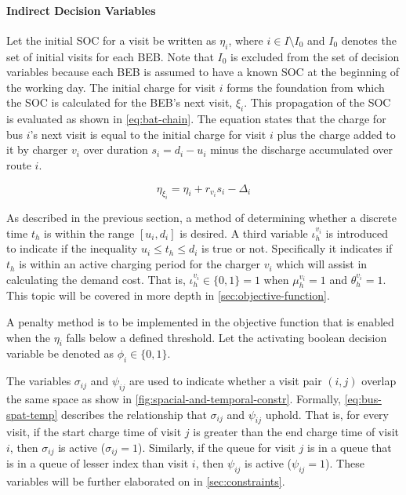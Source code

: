 \documentclass[11pt,a4paper,final]{article}
\newcommand{\Iset}{I}                       %
\begin{document}
\paragraph{Indirect Decision Variables}
\label{sec:indirect-decision-variables}
Let the initial SOC for a visit be written as \(\eta_i\), where \(i \in \Iset \setminus \Iset_0\) and \(\Iset_0\) denotes the set of
initial visits for each BEB. Note that \(\Iset_0\) is excluded from the set of decision variables because each BEB is
assumed to have a known SOC at the beginning of the working day. The initial charge for visit \(i\) forms the foundation
from which the SOC is calculated for the BEB's next visit, \(\xi_i\). This propagation of the SOC is evaluated as shown in
\ref{eq:bat-chain}. The equation states that the charge for bus \(i\)'s next visit is equal to the initial charge for visit \(i\)
plus the charge added to it by charger \(v_i\) over duration \(s_i = d_i - u_i\) minus the discharge accumulated over route
\(i\).

\begin{equation}
\label{eq:bat-chain}
  \eta_{\xi_i} = \eta_i + r_{v_i}s_i - \Delta_i
\end{equation}

As described in the previous section, a method of determining whether a discrete time \(t_h\) is within the range \([u_i,
d_i]\) is desired. A third variable \(\iota_h^{v_i}\) is introduced to indicate if the inequality \(u_i \le t_h \le d_i\) is true or
not. Specifically it indicates if \(t_h\) is within an active charging period for the charger \(v_i\) which will assist in
calculating the demand cost. That is, \(\iota_h^{v_i} \in \{0,1\} = 1\) when \(\mu_h^{v_i} = 1\) and \(\theta_h^{v_i} = 1\). This topic
will be covered in more depth in \ref{sec:objective-function}.

A penalty method is to be implemented in the objective function that is enabled when the \(\eta_i\) falls below a defined
threshold. Let the activating boolean decision variable be denoted as \(\phi_i \in \{0,1\}\).

The variables \(\sigma_{ij}\) and \(\psi_{ij}\) are used to indicate whether a visit pair \((i, j)\) overlap the same space as show in
\ref{fig:spacial-and-temporal-constr}. Formally, \ref{eq:bus-spat-temp} describes the relationship that \(\sigma_{ij}\) and \(\psi_{ij}\)
uphold. That is, for every visit, if the start charge time of visit \(j\) is greater than the end charge time of visit
\(i\), then \(\sigma_{ij}\) is active (\(\sigma_{ij} = 1\)). Similarly, if the queue for visit \(j\) is in a queue that is in a queue of
lesser index than visit \(i\), then \(\psi_{ij}\) is active (\(\psi_{ij} = 1\)). These variables will be further elaborated on in
\ref{sec:constraints}.
\end{document}
